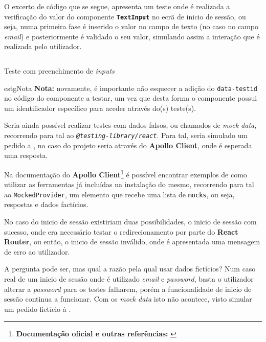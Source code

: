 O excerto de código que se segue, apresenta um teste onde é realizada a verificação do valor do componente \textbf{\texttt{TextInput}} no ecrã de inicio de sessão, ou seja, numa primeira fase é inserido o valor no campo de texto (no caso no campo \textit{email}) e posteriormente é validado o seu valor, simulando assim a interação que é realizada pelo utilizador.

\begin{longlisting}
	\inputminted[]{jsx}{code/tests/insert-text-input.test.tsx}
	\caption{Teste com preenchimento de \textit{inputs}}
\end{longlisting}

\begin{mybox}{estg}{Nota}
	\textbf{Nota:} novamente, é importante não esquecer a adição do \texttt{data-testid} no código do componente a testar, um vez que desta forma o componente possui um identificador específico para aceder através do(s) teste(s).
\end{mybox}

Seria ainda possível realizar testes com dados falsos, ou chamados de \textit{mock data}, recorrendo para tal ao \textit{ \texttt{@testing-library/react}}. Para tal, seria simulado um pedido a \textbf{}, no caso do projeto seria através do \textbf{Apollo Client}, onde é esperada uma resposta.

Na documentação do \textbf{Apollo Client}\footnote{\textbf{Documentação oficial e outras referências:} \cite{apolloTestsDocs,mockingApolloTesting,apolloTest,mockingData,mockingGraphql}} é possível encontrar exemplos de como utilizar as ferramentas já incluídas na instalação do mesmo, recorrendo para tal ao \texttt{MockedProvider}, um elemento que recebe uma lista de \texttt{mocks}, ou seja, respostas e dados factícios.

No caso do inicio de sessão existiriam duas possibilidades, o inicio de sessão com sucesso, onde era necessário testar o redirecionamento por parte do \textbf{React Router}, ou então, o inicio de sessão inválido, onde é apresentada uma mensagem de erro ao utilizador.

A pergunta pode ser, mas qual a razão pela qual usar dados fictícios? Num caso real de um inicio de sessão onde é utilizado \textit{email} e \textit{password}, basta o utilizador alterar a \textit{password} para os testes falharem, porém a funcionalidade de inicio de sessão continua a funcionar. Com os \textit{mock data} isto não acontece, visto simular um pedido fictício à \textbf{}.
